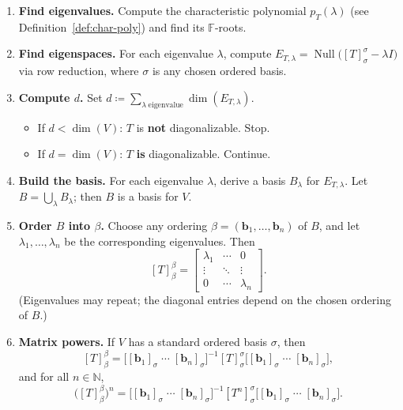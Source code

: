 \documentclass[11pt, a4paper, notitlepage]{report}
\theoremstyle{definition}
\theoremstyle{remark}
\begin{document}
\begin{enumerate}
  \item \textbf{Find eigenvalues.} Compute the characteristic polynomial $p_T(\lambda)$
        (see Definition~\ref{def:char-poly}) and find its $\mathbb{F}$-roots.
  \item \textbf{Find eigenspaces.} For each eigenvalue $\lambda$, compute
        $E_{T,\lambda} = \operatorname{Null}\!\bigl([T]_\sigma^\sigma - \lambda I\bigr)$
        via row reduction, where $\sigma$ is any chosen ordered basis.
  \item \textbf{Compute $d$.} Set
        $d \coloneqq \sum_{\lambda\;\text{eigenvalue}} \dim(E_{T,\lambda})$.
        \begin{itemize}
          \item If $d < \dim(V)$: $T$ is \textbf{not} diagonalizable. Stop.
          \item If $d = \dim(V)$: $T$ \textbf{is} diagonalizable. Continue.
        \end{itemize}
  \item \textbf{Build the basis.} For each eigenvalue $\lambda$, derive a basis $B_\lambda$
        for $E_{T,\lambda}$. Let $B = \bigcup_\lambda B_\lambda$; then $B$ is a basis for $V$.
  \item \textbf{Order $B$ into $\beta$.} Choose any ordering $\beta = (\mathbf{b}_1, \ldots, \mathbf{b}_n)$
        of $B$, and let $\lambda_1, \ldots, \lambda_n$ be the corresponding eigenvalues. Then
        \[
          [T]_\beta^\beta = \begin{bmatrix} \lambda_1 & \cdots & 0 \\ \vdots & \ddots & \vdots \\
          0 & \cdots & \lambda_n \end{bmatrix}.
        \]
        (Eigenvalues may repeat; the diagonal entries depend on the chosen ordering of $B$.)
  \item \textbf{Matrix powers.} If $V$ has a standard ordered basis $\sigma$, then
        \[
          [T]_\beta^\beta
          = \bigl[[\mathbf{b}_1]_\sigma \;\cdots\; [\mathbf{b}_n]_\sigma\bigr]^{-1}
            [T]_\sigma^\sigma
            \bigl[[\mathbf{b}_1]_\sigma \;\cdots\; [\mathbf{b}_n]_\sigma\bigr],
        \]
        and for all $n \in \mathbb{N}$,
        \[
          \bigl([T]_\beta^\beta\bigr)^n
          = \bigl[[\mathbf{b}_1]_\sigma \;\cdots\; [\mathbf{b}_n]_\sigma\bigr]^{-1}
            [T^n]_\sigma^\sigma
            \bigl[[\mathbf{b}_1]_\sigma \;\cdots\; [\mathbf{b}_n]_\sigma\bigr].
        \]
\end{enumerate}
\end{document}

